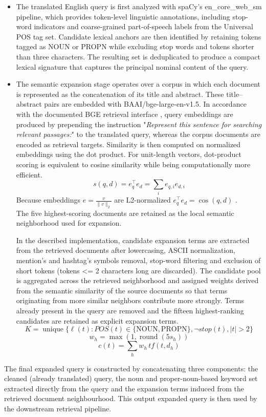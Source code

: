 \begin{itemize}
    \item The translated English query is first analyzed with spaCy’s en\_core\_web\_sm pipeline, which provides token-level linguistic annotations, including stop-word indicators and coarse-grained part-of-speech labels from the Universal POS tag set. Candidate lexical anchors are then identified by retaining tokens tagged as NOUN or PROPN while excluding stop words and tokens shorter than three characters. The resulting set is deduplicated to produce a compact lexical signature that captures the principal nominal content of the query.

    \item The semantic expansion stage operates over a corpus in which each document is represented as the concatenation of its title and abstract. These title–abstract pairs are embedded with BAAI/bge-large-en-v1.5. In accordance with the documented BGE retrieval interface \cite{bge-large-en-v1.5}, query embeddings are produced by prepending the instruction "\emph{Represent this sentence for searching relevant passages:}" to the translated query, whereas the corpus documents are encoded as retrieval targets. Similarity is then computed on normalized embeddings using the dot product. For unit-length vectors, dot-product scoring is equivalent to cosine similarity while being computationally more efficient.
    $$s(q,d)=e_q^\top e_d=\sum_i e_{q,i}e_{d,i}$$
    Because embeddings \(e = \frac{v}{\lVert v\rVert_2}\) are L2-normalized \(e_q^\top e_d = \cos(q,d)\) \cite{bge_large_model_card}.\\
    The five highest-scoring documents are retained as the local semantic neighborhood used for expansion.

    In the described implementation, candidate expansion terms are extracted from the retrieved documents after lowercasing, ASCII normalization, mention's and hashtag's symbols removal, stop-word filtering and exclusion of short tokens (tokens <= 2 characters long are discarded). The candidate pool is aggregated across the retrieved neighborhood and assigned weights derived from the semantic similarity of the source documents so that terms originating from more similar neighbors contribute more strongly. Terms already present in the query are removed and the fifteen highest-ranking candidates are retained as explicit expansion terms.
    \[
        K=\operatorname{unique}\{\ell(t): POS(t)\in\{\mathrm{NOUN},\mathrm{PROPN}\},\neg stop(t), |t|>2\}
    \]
    \[
        w_h=\max(1,\operatorname{round}(5s_h))
    \]
    \[
        c(t)=\sum_h w_h\,tf(t,d_h)
    \]
\end{itemize}
The final expanded query is constructed by concatenating three components: the cleaned (already translated) query, the noun and proper-noun-based keyword set extracted directly from the query and the expansion terms induced from the retrieved document neighbourhood.
This output expanded query is then used by the downstream retrieval pipeline.


